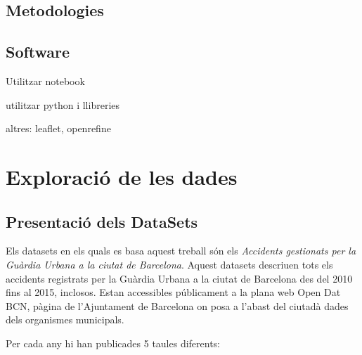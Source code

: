 \subsection{Metodologies}

\subsection{Software}
Utilitzar notebook

utilitzar python i llibreries

altres: leaflet, openrefine
\newpage
\section{Exploració de les dades}


\subsection{Presentació dels DataSets}

Els datasets en els quals es basa aquest treball són els \textit{Accidents gestionats per la Guàrdia Urbana a la ciutat de Barcelona}. Aquest datasets descriuen tots els accidents registrats per la Guàrdia Urbana a la ciutat de Barcelona des del 2010 fins al 2015, inclosos. Estan accessibles públicament a la plana web Open Dat BCN, pàgina de l'Ajuntament de Barcelona on posa a l'abast del ciutadà dades dels organismes municipals.

Per cada any hi han publicades 5 taules diferents:

